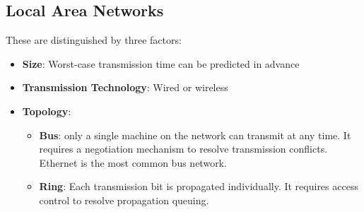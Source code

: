 \documentclass[twoside]{article}
\begin{document}
\subsection{Local Area Networks}
These are distinguished by three factors:
\begin{itemize}
    \item \textbf{Size}: Worst-case transmission time can be predicted in advance
    \item \textbf{Transmission Technology}: Wired or wireless
    \item \textbf{Topology}:
        \begin{itemize}
            \item \textbf{Bus}: only a single machine on the network can 
            transmit at any time. It requires a negotiation mechanism to resolve
            transmission conflicts. Ethernet is the most common bus network.
            \item \textbf{Ring}: Each transmission bit is propagated 
            individually. It requires access control to resolve propagation
            queuing.
        \end{itemize}
\end{itemize}
\end{document}
